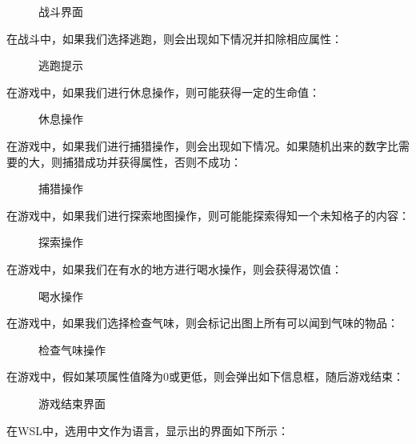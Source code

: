 \documentclass[hyperref,UTF8,a4paper]{ctexart}
\newcommand{\includegraphicx}[1]{\maxsizebox{\textwidth}{\textheight}{\texttt{[image: \#1]}}}
\begin{document}
\begin{figure}[H]
\centering
\includegraphicx{img/battle.png}
\caption{战斗界面}
\end{figure}

在战斗中，如果我们选择逃跑，则会出现如下情况并扣除相应属性：

\begin{figure}[H]
\centering
\includegraphicx{img/flee.png}
\caption{逃跑提示}
\end{figure}

在游戏中，如果我们进行休息操作，则可能获得一定的生命值：

\begin{figure}[H]
\centering
\includegraphicx{img/rest.png}
\caption{休息操作}
\end{figure}

在游戏中，如果我们进行捕猎操作，则会出现如下情况。如果随机出来的数字比需要的大，则捕猎成功并获得属性，否则不成功：

\begin{figure}[H]
\centering
\includegraphicx{img/hunt.png}
\caption{捕猎操作}
\end{figure}

在游戏中，如果我们进行探索地图操作，则可能能探索得知一个未知格子的内容：

\begin{figure}[H]
\centering
\includegraphicx{img/explore.png}
\caption{探索操作}
\end{figure}

在游戏中，如果我们在有水的地方进行喝水操作，则会获得渴饮值：

\begin{figure}[H]
\centering
\includegraphicx{img/drink.png}
\caption{喝水操作}
\end{figure}

在游戏中，如果我们选择检查气味，则会标记出图上所有可以闻到气味的物品：

\begin{figure}[H]
\centering
\includegraphicx{img/check.png}
\caption{检查气味操作}
\end{figure}

在游戏中，假如某项属性值降为0或更低，则会弹出如下信息框，随后游戏结束：

\begin{figure}[H]
\centering
\includegraphicx{img/gameover.png}
\caption{游戏结束界面}
\end{figure}

在WSL中，选用中文作为语言，显示出的界面如下所示：
\end{document}
